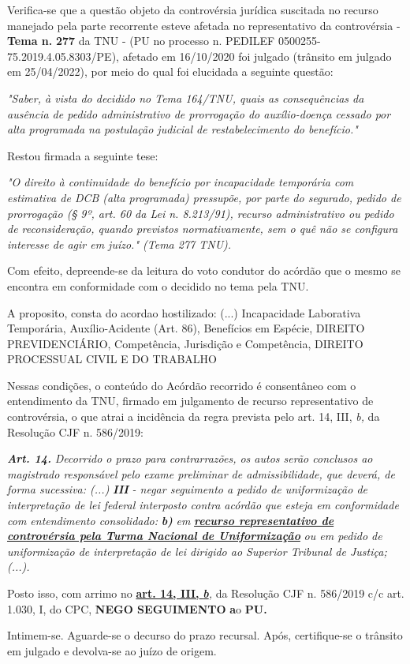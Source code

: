 \documentclass[12pt]{article}
\begin{document}
\justifying
\noindent Verifica-se que a questão objeto da controvérsia jurídica suscitada no recurso manejado pela parte recorrente esteve afetada no representativo da controvérsia - \textbf{Tema n. }\textbf{277} da TNU - (PU no processo n. PEDILEF 0500255-75.2019.4.05.8303/PE),  afetado em 16/10/2020 foi julgado (trânsito em julgado em 25/04/2022), por meio do qual foi elucidada a seguinte questão:

\noindent \textit{"Saber, à vista do decidido no Tema 164/TNU, quais as consequências da ausência de pedido administrativo de prorrogação do auxílio-doença cessado por alta programada na postulação judicial de restabelecimento do benefício."}

\noindent Restou firmada a seguinte tese:

\noindent \textit{"O direito à continuidade do benefício por incapacidade temporária com estimativa de DCB (alta programada) pressupõe, por parte do segurado, pedido de prorrogação (§ 9º, art. 60 da Lei n. 8.213/91), recurso administrativo ou pedido de reconsideração, quando previstos normativamente, sem o quê não se configura interesse de agir em juízo." (Tema 277 TNU).}

\noindent Com efeito, depreende-se da leitura do voto condutor do acórdão que o mesmo se encontra em conformidade com o decidido no  tema pela TNU.

\noindent A proposito, consta do acordao hostilizado: (...) Incapacidade Laborativa Temporária, Auxílio-Acidente (Art. 86), Benefícios em Espécie, DIREITO PREVIDENCIÁRIO, Competência, Jurisdição e Competência, DIREITO PROCESSUAL CIVIL E DO TRABALHO

\noindent Nessas condições, o conteúdo do Acórdão recorrido é consentâneo com o entendimento da TNU, firmado em julgamento de recurso representativo de controvérsia, o que atrai a incidência da regra prevista pelo art. 14, III, \textit{b,} da Resolução CJF n. 586/2019:

\noindent \textit{\textbf{Art. 14.}}\textit{ Decorrido o prazo para contrarrazões, os autos serão conclusos ao magistrado responsável pelo exame preliminar de admissibilidade, que deverá, de forma sucessiva: (...) }\textit{\textbf{III }}\textit{- negar seguimento a pedido de uniformização de interpretação de lei federal interposto contra acórdão que esteja em conformidade com entendimento consolidado: }\textit{\textbf{b)}}\textit{ em }\uline{\textit{\textbf{recurso representativo de controvérsia pela Turma Nacional de Uniformização}}}\textit{ ou em pedido de uniformização de interpretação de lei dirigido ao Superior Tribunal de Justiça;(...).}

\noindent Posto isso, com arrimo no \uline{\textbf{art. 14, III, }}\uline{\textit{\textbf{b}}}\textit{,} da Resolução CJF n. 586/2019 c/c art. 1.030, I, do CPC, \textbf{NEGO SEGUIMENTO }\textbf{a}o\textbf{ PU}\textbf{.}

\noindent Intimem-se. Aguarde-se o decurso do prazo recursal. Após, certifique-se o trânsito em julgado e devolva-se ao juízo de origem.
\end{document}
